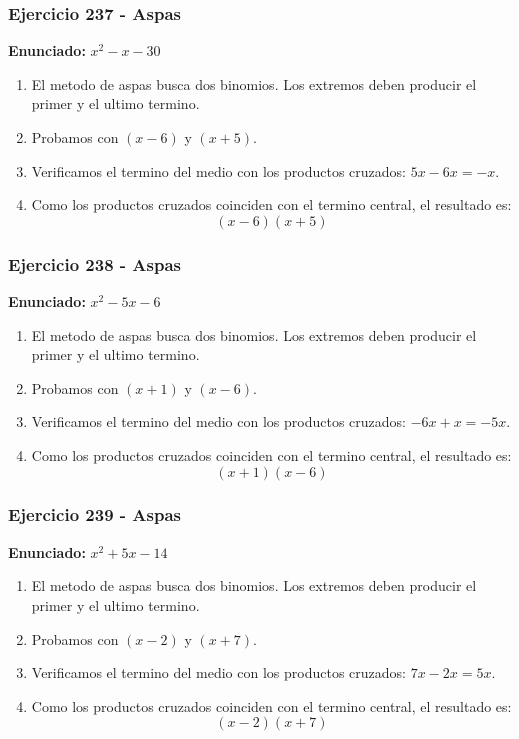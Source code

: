 \documentclass[11pt,a4paper]{article}
\begin{document}
\vspace{0.2cm}
\subsubsection*{Ejercicio 237 - Aspas}
\textbf{Enunciado:} $ x^{2} - x - 30 $\par
\begin{enumerate}[leftmargin=2em]
\item El metodo de aspas busca dos binomios. Los extremos deben producir el primer y el ultimo termino.
\item Probamos con \((x - 6)\) y \((x + 5)\).
\item Verificamos el termino del medio con los productos cruzados: \(5 x- 6 x=- x\).
\item Como los productos cruzados coinciden con el termino central, el resultado es: \[\boxed{\left(x - 6\right)\left(x + 5\right)}\]
\end{enumerate}

\vspace{0.2cm}
\subsubsection*{Ejercicio 238 - Aspas}
\textbf{Enunciado:} $ x^{2} - 5 x - 6 $\par
\begin{enumerate}[leftmargin=2em]
\item El metodo de aspas busca dos binomios. Los extremos deben producir el primer y el ultimo termino.
\item Probamos con \((x + 1)\) y \((x - 6)\).
\item Verificamos el termino del medio con los productos cruzados: \(- 6 x+x=- 5 x\).
\item Como los productos cruzados coinciden con el termino central, el resultado es: \[\boxed{\left(x + 1\right)\left(x - 6\right)}\]
\end{enumerate}

\vspace{0.2cm}
\subsubsection*{Ejercicio 239 - Aspas}
\textbf{Enunciado:} $ x^{2} + 5 x - 14 $\par
\begin{enumerate}[leftmargin=2em]
\item El metodo de aspas busca dos binomios. Los extremos deben producir el primer y el ultimo termino.
\item Probamos con \((x - 2)\) y \((x + 7)\).
\item Verificamos el termino del medio con los productos cruzados: \(7 x- 2 x=5 x\).
\item Como los productos cruzados coinciden con el termino central, el resultado es: \[\boxed{\left(x - 2\right)\left(x + 7\right)}\]
\end{enumerate}
\end{document}
